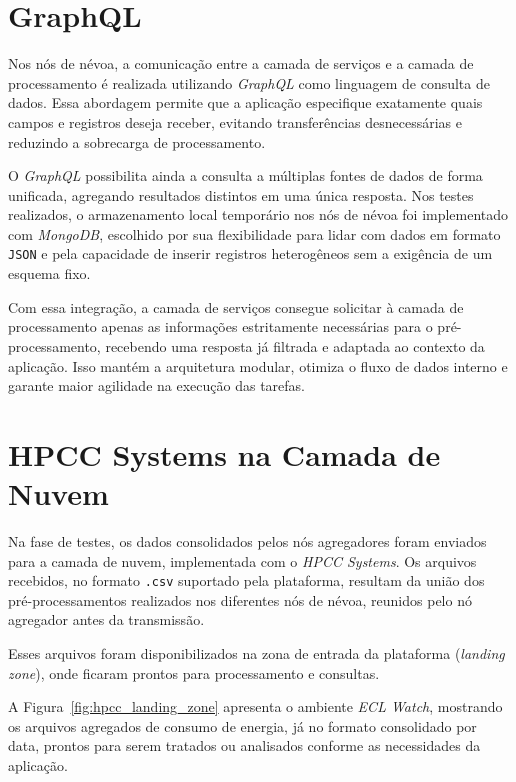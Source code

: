 \section{GraphQL}

Nos nós de névoa, a comunicação entre a camada de serviços e a camada de processamento é realizada utilizando \textit{GraphQL} como linguagem de consulta de dados. Essa abordagem permite que a aplicação especifique exatamente quais campos e registros deseja receber, evitando transferências desnecessárias e reduzindo a sobrecarga de processamento.  

O \textit{GraphQL} possibilita ainda a consulta a múltiplas fontes de dados de forma unificada, agregando resultados distintos em uma única resposta. Nos testes realizados, o armazenamento local temporário nos nós de névoa foi implementado com \textit{MongoDB}, escolhido por sua flexibilidade para lidar com dados em formato \texttt{JSON} e pela capacidade de inserir registros heterogêneos sem a exigência de um esquema fixo.  

Com essa integração, a camada de serviços consegue solicitar à camada de processamento apenas as informações estritamente necessárias para o pré-processamento, recebendo uma resposta já filtrada e adaptada ao contexto da aplicação. Isso mantém a arquitetura modular, otimiza o fluxo de dados interno e garante maior agilidade na execução das tarefas.

\section{HPCC Systems na Camada de Nuvem}

Na fase de testes, os dados consolidados pelos nós agregadores foram enviados para a camada de nuvem, implementada com o \textit{HPCC Systems}. Os arquivos recebidos, no formato \texttt{.csv} suportado pela plataforma, resultam da união dos pré-processamentos realizados nos diferentes nós de névoa, reunidos pelo nó agregador antes da transmissão.  

Esses arquivos foram disponibilizados na zona de entrada da plataforma (\textit{landing zone}), onde ficaram prontos para processamento e consultas.  

A Figura~\ref{fig:hpcc_landing_zone} apresenta o ambiente \textit{ECL Watch}, mostrando os arquivos agregados de consumo de energia, já no formato consolidado por data, prontos para serem tratados ou analisados conforme as necessidades da aplicação.

